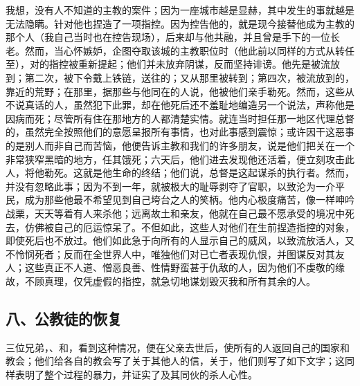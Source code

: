 我想，没有人不知道的主教的案件；因为一座城市越是显赫，其中发生的事就越是无法隐瞒。针对他也捏造了一项指控。因为控告他的，就是现今接替他成为主教的那个人（我自己当时也在控告现场），后来却与他共融，并且曾是手下的一位长老。然而，当心怀嫉妒，企图夺取该城的主教职位时（他此前以同样的方式从转任至），对的指控被重新提起；他们并未放弃阴谋，反而坚持诽谤。他先是被流放到；第二次，被下令戴上铁链，送往的；又从那里被转到；第四次，被流放到的，靠近的荒野；在那里，据那些与他同在的人说，他被他们亲手勒死。然而，这些从不说真话的人，虽然犯下此罪，却在他死后还不羞耻地编造另一个说法，声称他是因病而死；尽管所有住在那地方的人都清楚实情。就连当时担任那一地区代理总督的，虽然完全按照他们的意愿呈报所有事情，也对此事感到震惊；或许因干这恶事的是别人而非自己而苦恼，他便告诉主教和我们的许多朋友，说是他们把关在一个非常狭窄黑暗的地方，任其饿死；六天后，他们进去发现他还活着，便立刻攻击此人，将他勒死。这就是他生命的终结；他们说，总督是这起谋杀的执行者。然而，并没有忽略此事；因为不到一年，就被极大的耻辱剥夺了官职，以致沦为一介平民，成为那些他最不希望见到自己垮台之人的笑柄。他内心极度痛苦，像一样呻吟战栗，天天等着有人来杀他；远离故土和亲友，他就在自己最不愿承受的境况中死去，仿佛被自己的厄运惊呆了。不但如此，这些人对他们在生前捏造指控的对象，即使死后也不放过。他们如此急于向所有的人显示自己的威风，以致流放活人，又不怜悯死者；反而在全世界人中，唯独他们对已亡者表现仇恨，并图谋反对其友人；这些真正不人道、憎恶良善、性情野蛮甚于仇敌的人，因为他们不虔敬的缘故，不顾真理，仅凭虚假的指控，就急切地谋划毁灭我和所有其余的人。\par


\subsection{八、公教徒的恢复}

三位兄弟，、和，看到这种情况，便在父亲去世后，使所有的人返回自己的国家和教会；他们给各自的教会写了关于其他人的信，关于，他们则写了如下文字；这同样表明了整个过程的暴力，并证实了及其同伙的杀人心性。\par

